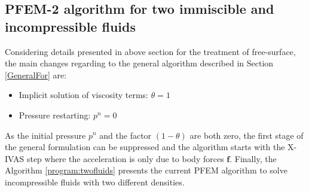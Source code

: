 \subsection[PFEM-2 free-surface algorithm]{PFEM-2 algorithm for two immiscible and incompressible fluids}

Considering details presented in above section for the treatment of free-surface, the main changes regarding to the general algorithm described in Section \ref{GeneralFor} are:
\begin{itemize}
  \item Implicit solution of viscosity terms: $\theta=1$
  \item Pressure restarting: $p^n=0$
\end{itemize}
As the initial pressure $p^n$ and the factor $(1-\theta)$ are both zero, the first stage of the general formulation can be suppressed and the algorithm starts with the X-IVAS step where the acceleration is only due to body forces $\mathbf{f}$. Finally, the Algorithm \ref{program:twofluids} presents the current PFEM algorithm to solve incompressible fluids with two different densities.

